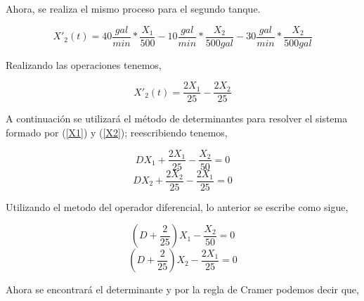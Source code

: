 \documentclass[titlepage]{article}
\begin{document}
            Ahora, se realiza el mismo proceso para el segundo tanque.
            
                \begin{equation*}
                    X'_2(t)= 40\frac{gal}{min}*\frac{X_1}{500} - 10\frac{gal}{min}*\frac{X_2}{500gal} - 30\frac{gal}{min}*\frac{X_2}{500gal}
                \end{equation*}\vspace{0.1cm}
            
            Realizando las operaciones tenemos,
                
                \begin{equation}
                    X'_2(t) = \frac{2X_1}{25} - \frac{2X_2}{25}
                    \label{X2}
                \end{equation}\vspace{0.1cm}   
                
            A continuación se utilizará el método de determinantes para resolver el sistema formado por (\ref{X1}) y (\ref{X2}); reescribiendo tenemos,
            
                \begin{equation*}
                    DX_1 + \frac{2X_1}{25} - \frac{X_2}{50} = 0
                \end{equation*}
                \begin{equation*}
                    DX_2 + \frac{2X_2}{25} - \frac{2X_1}{25} = 0
                \end{equation*}
            
            Utilizando el metodo del operador diferencial, lo anterior se escribe como sigue, 
                
                \begin{equation*}
                    (D + \frac{2}{25})X_1 - \frac{X_2}{50} = 0
                \end{equation*}
                \begin{equation*}
                    (D + \frac{2}{25})X_2 - \frac{2X_1}{25} = 0
                \end{equation*}
            
            Ahora se encontrará el determinante y por la regla de Cramer podemos decir que,
            
\end{document}
